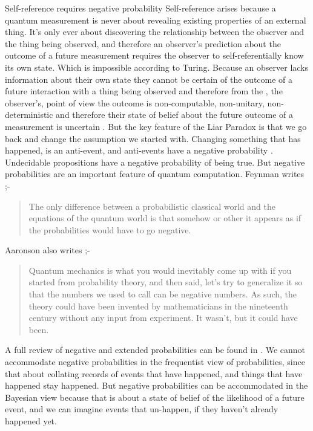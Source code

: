 \documentclass[final]{beamer}
\newlength{\colwidth}
\begin{document}
\begin{frame}[t]
\begin{columns}[t]
\begin{column}{\colwidth}
  \begin{block}{Self-reference requires negative probability}
  Self-reference arises because a quantum measurement is never about revealing existing properties of an external thing. It's only ever about discovering the relationship between the observer and the thing being observed, and therefore an observer's prediction about the outcome of a future measurement requires the observer to self-referentially know its own state. Which is impossible according to Turing. Because an observer lacks information about their own state they cannot be certain of the outcome of a future interaction with a thing being observed and therefore from the , the observer's, point of view the outcome is non-computable, non-unitary, non-deterministic and therefore their state of belief about the future outcome of a measurement is uncertain . But the key feature of the Liar Paradox is that we go back and change the assumption we started with. Changing something that has happened, is an anti-event, and anti-events have a negative probability \autocite{Burgin2013}. Undecidable propositions have a negative probability of being true. But negative probabilities are an important feature of quantum computation. Feynman writes \autocite{Feynman_r_82} ;-
  
  \begin{quote}
    The only difference between a probabilistic classical world and the equations of the quantum world is that somehow or other it appears as if the probabilities would have to go negative.
  \end{quote}
  
  Aaronson also writes \autocite{Aaronson:dem};-
  
  \begin{quote}
  Quantum mechanics is what you would inevitably come up with if you started from probability theory, and then said, let's try to generalize it so that the numbers we used to call  can be negative numbers. As such, the theory could have been invented by mathematicians in the nineteenth century without any input from experiment. It wasn't, but it could have been.\\
  \end{quote}
  \par
  A full review of negative and extended probabilities can be found in \autocite{muckenheim_1986}. We cannot accommodate negative probabilities in the frequentist view of probabilities, since that about collating records of events that have happened, and things that have happened stay happened. But negative probabilities can be accommodated in the Bayesian view because that is about a state of belief of the likelihood of a future event, and we can imagine events that un-happen, if they haven't already happened yet. 
  \end{block}


\end{column}
\end{columns}
\end{frame}
\end{document}
